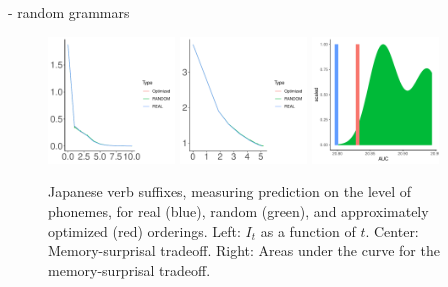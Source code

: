 - random grammars


\begin{figure}
	\begin{center}
\includegraphics[width=0.3\textwidth]{figures/Japanese-suffixes-byPhonemes-it.pdf}
\includegraphics[width=0.3\textwidth]{figures/Japanese-suffixes-byPhonemes-memsurp.pdf}
\includegraphics[width=0.3\textwidth]{figures/Japanese-suffixes-byPhonemes-auc-hist.pdf}
\end{center}
	\caption{Japanese verb suffixes, measuring prediction on the level of phonemes, for real (blue), random (green), and approximately optimized (red) orderings. Left: $I_t$ as a function of $t$. Center: Memory-surprisal tradeoff. Right: Areas under the curve for the memory-surprisal tradeoff.}\label{fig:jap-phon}
\end{figure}


